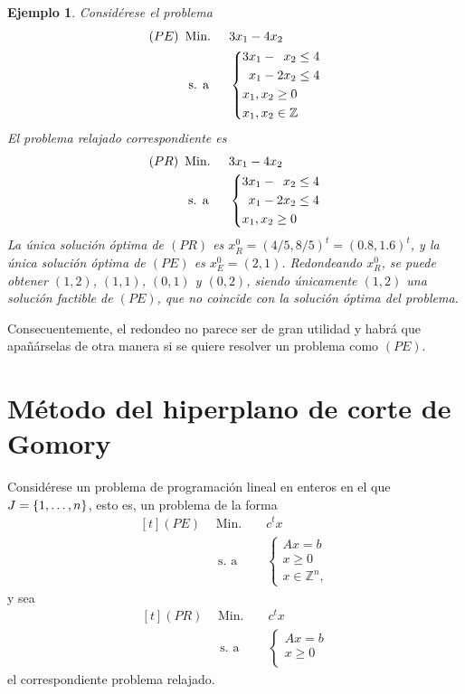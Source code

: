 \documentclass[11pt]{report}
\theoremstyle{mytheorem}
\theoremstyle{mydefinition}
\theoremstyle{myexample}
\newtheorem*{example}{Ejemplo}
\newcommand{\Z}{\mathbb Z}
\begin{document}
\begin{example}
Considérese el problema
\[\begin{aligned}[t]
(PE)\ \,&\text{Min. } && 3x_1-4x_2 \\
& \; \text{s. a} &&\left\{\begin{alignedat}{10}
& 3&x_1 & {}-{} &  &x_2 & {}\leq{} &4 \\
&  &x_1 & {}-{} & 2&x_2 & {}\leq{} &4 \\
&\mathrlap{x_1,x_2 \geq 0} \\
&\mathrlap{x_1,x_2 \in \Z}
\end{alignedat}\right.
\end{aligned}\]
El problema relajado correspondiente es
\[\begin{aligned}[t]
(PR)\ \,&\text{Min. } && 3x_1-4x_2 \\
& \; \text{s. a} &&\left\{\begin{alignedat}{10}
& 3&x_1 & {}-{} &  &x_2 & {}\leq{} &4 \\
&  &x_1 & {}-{} & 2&x_2 & {}\leq{} &4 \\
&\mathrlap{x_1,x_2 \geq 0}
\end{alignedat}\right.
\end{aligned}\]
La única solución óptima de $(PR)$ es $x^0_R = (4/5,8/5)^t = (0.8,1.6)^t$, y la única solución óptima de $(PE)$ es $x^0_E = (2,1)$. Redondeando $x^0_R$, se puede obtener $(1,2)$, $(1,1)$, $(0,1)$ y $(0,2)$, siendo únicamente $(1,2)$ una solución factible de $(PE)$, que no coincide con la solución óptima del problema.
\end{example}

Consecuentemente, el redondeo no parece ser de gran utilidad y habrá que apañárselas de otra manera si se quiere resolver un problema como $(PE)$.

\section{Método del hiperplano de corte de Gomory}

Considérese un problema de programación lineal en enteros en el que $J = \{1,\mathellipsis,n\}$, esto es, un problema de la forma
\[\begin{aligned}[t]
(PE)\ \, &\text{Min. } && c^tx \\
& \, \text{s. a} &&\begin{cases}
Ax=b  \\
x \geq 0 \\
x \in \Z^n,
\end{cases}
\end{aligned}\]
y sea
\[\begin{aligned}[t]
(PR)\ \, &\text{Min. } && c^tx \\
& \, \text{s. a} &&\begin{cases}
Ax=b  \\
x \geq 0 \\
\end{cases}
\end{aligned}\]
el correspondiente problema relajado.
\end{document}
